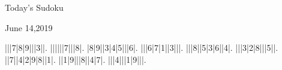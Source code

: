 \documentclass{article}
\begin{document}
\begin{center}
\Huge{Today's Sudoku}
\end{center}
\begin{center}
\Large{June 14,2019}
\end{center}
\begin{sudoku}
|||7|8|9|||3||.
||||||7|||8|.
|8|9||3|4|5|||6|.
|||6|7|1||3|||.
|||8||5|3|6||4|.
|||3|2|8|||5||.
||7||4|2|9|8||1|.
||1|9|||8||4|7|.
|||4|||1|9|||.
\end{sudoku}
\end{document}
